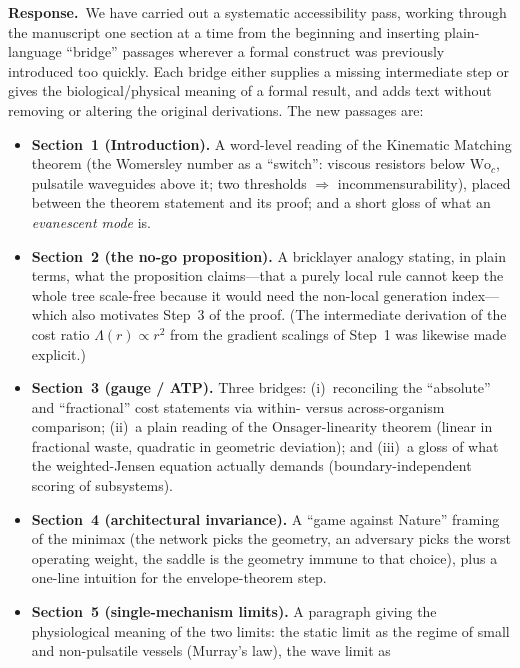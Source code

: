 \documentclass[11pt]{article}
\newcommand{\response}{\par\medskip\noindent\textbf{Response.}\ }
\begin{document}
\response We have carried out a systematic accessibility pass, working through
the manuscript one section at a time from the beginning and inserting
plain-language ``bridge'' passages wherever a formal construct was previously
introduced too quickly. Each bridge either supplies a missing intermediate step
or gives the biological/physical meaning of a formal result, and adds text
without removing or altering the original derivations. The new passages are:
\begin{itemize}[leftmargin=1.4em,itemsep=3pt,topsep=2pt]
  \item \textbf{Section~1 (Introduction).} A word-level reading of the Kinematic
        Matching theorem (the Womersley number as a ``switch'': viscous resistors
        below $\mathrm{Wo}_c$, pulsatile waveguides above it; two thresholds
        $\Rightarrow$ incommensurability), placed between the theorem statement
        and its proof; and a short gloss of what an \emph{evanescent mode} is.
  \item \textbf{Section~2 (the no-go proposition).} A bricklayer analogy stating,
        in plain terms, what the proposition claims---that a purely local rule
        cannot keep the whole tree scale-free because it would need the
        non-local generation index---which also motivates Step~3 of the proof.
        (The intermediate derivation of the cost ratio $\Lambda(r)\propto r^{2}$
        from the gradient scalings of Step~1 was likewise made explicit.)
  \item \textbf{Section~3 (gauge / ATP).} Three bridges: (i)~reconciling the
        ``absolute'' and ``fractional'' cost statements via within- versus
        across-organism comparison; (ii)~a plain reading of the Onsager-linearity
        theorem (linear in fractional waste, quadratic in geometric deviation);
        and (iii)~a gloss of what the weighted-Jensen equation actually demands
        (boundary-independent scoring of subsystems).
  \item \textbf{Section~4 (architectural invariance).} A ``game against Nature''
        framing of the minimax (the network picks the geometry, an adversary
        picks the worst operating weight, the saddle is the geometry immune to
        that choice), plus a one-line intuition for the envelope-theorem step.
  \item \textbf{Section~5 (single-mechanism limits).} A paragraph giving the
        physiological meaning of the two limits: the static limit as the regime
        of small and non-pulsatile vessels (Murray's law), the wave limit as

\end{itemize}
\end{document}
